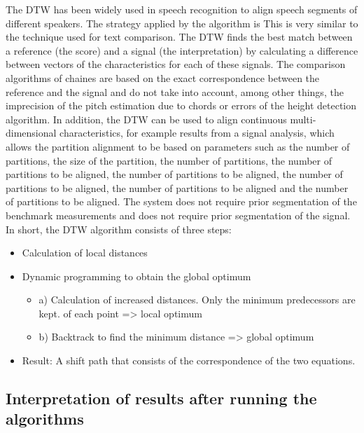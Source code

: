 \documentclass{article}
\begin{document}
The DTW has been widely used in speech recognition to align speech segments of different speakers. The strategy applied by the algorithm is This is very similar to the technique used for text comparison. The DTW finds the best match between a reference (the score) and a signal (the interpretation) by calculating a difference between vectors of the characteristics for each of these signals. The comparison algorithms of chaines are based on the exact correspondence between the reference and the signal and do not take into account, among other things, the imprecision of the pitch estimation due to chords or errors of the height detection algorithm. In addition, the DTW can be used to align continuous multi-dimensional characteristics, for example results from a signal analysis, which allows the partition alignment to be based on parameters such as the number of partitions, the size of the partition, the number of partitions, the number of partitions to be aligned, the number of partitions to be aligned, the number of partitions to be aligned, the number of partitions to be aligned and the number of partitions to be aligned.
The system does not require prior segmentation of the benchmark measurements and does not require prior segmentation of the
signal.
In short, the DTW algorithm consists of three steps:

\begin{itemize}
    \item Calculation of local distances
    \item Dynamic programming to obtain the global optimum \begin{itemize}
        \item a) Calculation of increased distances. Only the minimum predecessors are kept. of each point => local optimum
        \item b) Backtrack to find the minimum distance => global optimum
    \end{itemize}
    \item Result: A shift path that consists of the correspondence of the two equations.

    
\end{itemize}

\subsection{Interpretation of results after running the algorithms}
\end{document}
